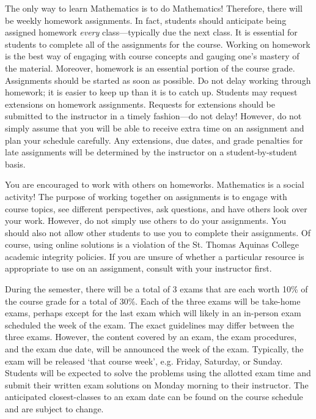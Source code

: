 \documentclass[11pt,letterpaper]{article}
\begin{document}
The only way to learn Mathematics is to do Mathematics! Therefore, there will be weekly homework assignments. In fact, students should anticipate being assigned homework {\itshape every} class---typically due the next class. It is essential for students to complete all of the assignments for the course. Working on homework is the best way of engaging with course concepts and gauging one's mastery of the material. Moreover, homework is an essential portion of the course grade. Assignments should be started as soon as possible. Do not delay working through homework; it is easier to keep up than it is to catch up. Students may request extensions on homework assignments. Requests for extensions should be submitted to the instructor in a timely fashion---do not delay! However, do not simply assume that you will be able to receive extra time on an assignment and plan your schedule carefully. Any extensions, due dates, and grade penalties for late assignments will be determined by the instructor on a student-by-student basis. \pspace

You are encouraged to work with others on homeworks. Mathematics is a social activity! The purpose of working together on assignments is to engage with course topics, see different perspectives, ask questions, and have others look over your work. However, do not simply use others to do your assignments. You should also not allow other students to use you to complete their assignments. Of course, using online solutions is a violation of the St. Thomas Aquinas College academic integrity policies. If you are unsure of whether a particular resource is appropriate to use on an assignment, consult with your instructor first. \sectionbreak



During the semester, there will be a total of 3 exams that are each worth 10\% of the course grade for a total of 30\%. Each of the three exams will be take-home exams, perhaps except for the last exam which will likely in an in-person exam scheduled the week of the exam. The exact guidelines may differ between the three exams. However, the content covered by an exam, the exam procedures, and the exam due date, will be announced the week of the exam. Typically, the exam will be released `that course week', e.g. Friday, Saturday, or Sunday. Students will be expected to solve the problems using the allotted exam time and submit their written exam solutions on Monday morning to their instructor. The anticipated closest-classes to an exam date can be found on the course schedule and are subject to change. \pspace
\end{document}
